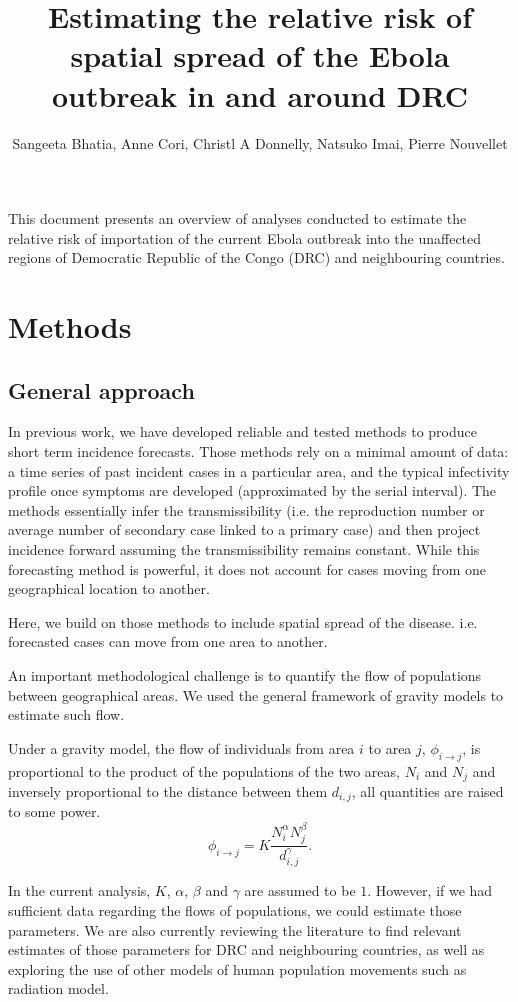 \documentclass[11pt,]{article}
\title{Estimating the relative risk of spatial spread of the Ebola
  outbreak in and around DRC}
\author{Sangeeta Bhatia, Anne Cori, Christl A Donnelly,
   Natsuko Imai, Pierre Nouvellet}
\begin{document}
\maketitle
This document presents an overview of analyses conducted to estimate the relative
risk of importation of the current Ebola outbreak into the unaffected
regions of
Democratic Republic of the Congo (DRC) and neighbouring countries.

\section*{Methods}

\subsection*{General approach}

In previous work, we have developed reliable and tested methods
\citep{cori2013new, who2014ebola, nouvellet2017simple} to produce
short term incidence forecasts.
Those methods rely on a minimal amount of data: a time series of
past incident cases in a particular area, and the typical infectivity profile once
symptoms are developed (approximated by the serial interval).
The methods essentially infer the transmissibility (i.e. the
reproduction number or average number of secondary case linked to a
primary case)
and then project incidence forward assuming the transmissibility
remains constant.
While this forecasting method is powerful, it does not account for cases moving from one geographical location to another.

Here, we build on those methods to include spatial spread of the
disease. i.e. forecasted cases can move from one area to another.

An important methodological challenge is to quantify the flow of
populations between geographical areas.
We used the general framework of gravity models to estimate such flow.

Under a gravity model, the flow of individuals from area \(i\) to area \(j\),
\(\phi_{i \rightarrow j}\), is proportional to the product of the
populations of the two areas, \(N_i\) and \(N_j\) and inversely
proportional to the distance between them \(d_{i, j}\), all quantities
are raised to some power.
\[
  \phi_{i \rightarrow j} = K \frac{N_i^{\alpha}N_j^{\beta}}{d_{i, j}^{\gamma}}.
\]

In the current analysis, \(K\), \( \alpha \), \( \beta \) and \(\gamma\) 
are assumed to be $1$. However, if we had sufficient data regarding
the flows of populations, we could estimate those parameters.
We are also currently reviewing the literature to find relevant
estimates of those parameters for DRC and neighbouring countries,
as well as exploring the use of other models of human population movements such as radiation model. 
\end{document}
